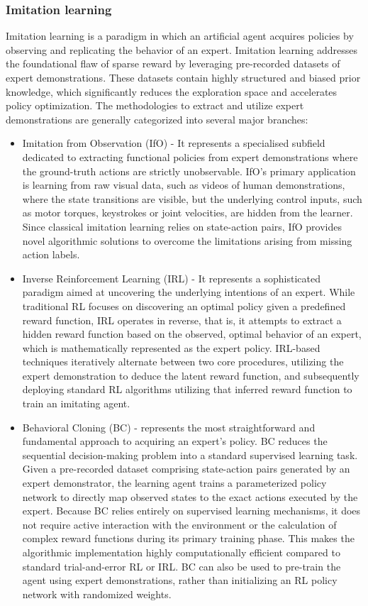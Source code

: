 \subsubsection{Imitation learning}
Imitation learning is a paradigm in which an artificial agent acquires policies by observing and replicating the behavior of an expert. Imitation learning addresses the foundational flaw of sparse reward by leveraging pre-recorded datasets of expert demonstrations. These datasets contain highly structured and biased prior knowledge, which significantly reduces the exploration space and accelerates policy optimization. The methodologies to extract and utilize expert demonstrations are generally categorized into several major branches:
\begin{itemize}
	\item Imitation from Observation (IfO) - It represents a specialised subfield dedicated to extracting functional policies from expert demonstrations where the ground-truth actions are strictly unobservable. IfO's primary application is learning from raw visual data, such as videos of human demonstrations, where the state transitions are visible, but the underlying control inputs, such as motor torques, keystrokes or joint velocities, are hidden from the learner. Since classical imitation learning relies on state-action pairs, IfO provides novel algorithmic solutions to overcome the limitations arising from missing action labels.  \cite{ding2020imitation}
	\item Inverse Reinforcement Learning (IRL) - It represents a sophisticated paradigm aimed at uncovering the underlying intentions of an expert. While traditional RL focuses on discovering an optimal policy given a predefined reward function, IRL operates in reverse, that is, it attempts to extract a hidden reward function based on the observed, optimal behavior of an expert, which is mathematically represented as the expert policy. IRL-based techniques iteratively alternate between two core procedures, utilizing the expert demonstration to deduce the latent reward function, and subsequently deploying standard RL algorithms utilizing that inferred reward function to train an imitating agent. \cite{ding2020imitation}
	\item Behavioral Cloning (BC) - represents the most straightforward and fundamental approach to acquiring an expert's policy. BC reduces the sequential decision-making problem into a standard supervised learning task. Given a pre-recorded dataset comprising state-action pairs generated by an expert demonstrator, the learning agent trains a parameterized policy network to directly map observed states to the exact actions executed by the expert. Because BC relies entirely on supervised learning mechanisms, it does not require active interaction with the environment or the calculation of complex reward functions during its primary training phase. This makes the algorithmic implementation highly computationally efficient compared to standard trial-and-error RL or IRL.  BC can also be used to pre-train the agent using expert demonstrations, rather than initializing an RL policy network with randomized weights. \cite{ding2020imitation}

\end{itemize}
